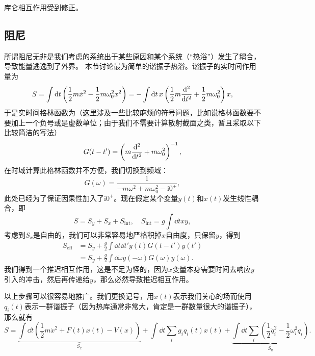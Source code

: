 \documentclass[hyperref, UTF8, a4paper]{ctexart}
\newcommand*{\ii}{\mathrm{i}}
\begin{document}
库仑相互作用受到修正。

\subsection{阻尼}

所谓阻尼无非是我们考虑的系统出于某些原因和某个系统（“热浴”）发生了耦合，导致能量逃逸到了外界。
本节讨论最为简单的谐振子热浴。谐振子的实时间作用量为
\begin{equation}
    S = \int \dd{t} \left( \frac{1}{2} m \dot{x}^2 - \frac{1}{2} m \omega_0^2 x^2 \right) = - \int \dd{t} x \left( \frac{1}{2} m \dv[2]{t} + \frac{1}{2} m \omega_0^2 \right) x,
\end{equation}
于是实时间格林函数为（这里涉及一些比较麻烦的符号问题，比如说格林函数要不要加上一个负号或是虚数单位；由于我们不需要计算散射截面之类，暂且采取以下比较简洁的写法）
\begin{equation}
    G(t-t') = \left( m \dv[2]{t} + m \omega_0^2 \right)^{-1},
\end{equation}
在时域计算此格林函数并不方便，我们切换到频域：
\begin{equation}
    G(\omega) = \frac{1}{- m \omega^2 + m \omega_0^2 - \ii 0^+},
\end{equation}
此处已经为了保证因果性加入了$\ii 0^+$。现在假定某个变量$y(t)$和$x(t)$发生线性耦合，即
\begin{equation}
    S = S_y + S_x + S_\text{int}, \quad S_\text{int} = g \int \dd{t} xy,
\end{equation}
考虑到$S_x$是自由的，我们可以非常容易地严格积掉$x$自由度，只保留$y$，得到
\begin{equation}
    \begin{aligned}
        S_\text{eff} &= S_y + \frac{g}{2} \int \dd{t} \dd{t'} y(t) G(t-t') y(t') \\
        &= S_y + \frac{g}{2} \int \dd{\omega} y(-\omega) G(\omega) y(\omega).
    \end{aligned}
\end{equation}
我们得到一个推迟相互作用，这是不足为怪的，因为$x$变量本身需要时间去响应$y$引入的冲击，然后再传递给$y$，那么必然导致推迟相互作用。

以上步骤可以很容易地推广。我们更换记号，用$x(t)$表示我们关心的场而使用$q_i(t)$表示一群谐振子（因为热库通常非常大，肯定是一群数量很大的谐振子），那么就有
\begin{equation}
    S = \underbrace{\int \dd{t} \left( \frac{1}{2} m \dot{x}^2 + F(t) x(t) - V(x) \right)}_{S_x} + \int \dd{t} \sum_i g_i q_i(t) x(t) + \underbrace{\int \dd{t} \sum_i \left( \frac{1}{2} \dot{q}_i^2 - \frac{1}{2} \omega_i^2 q_i \right)}_{S_q}.
\end{equation}
\end{document}

